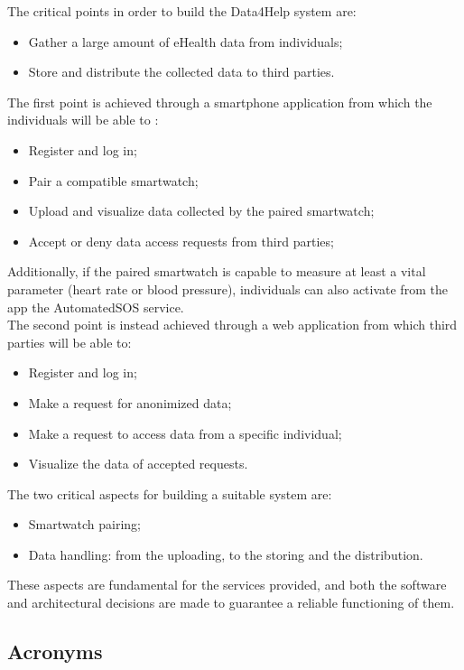 The critical points in order to build the Data4Help system are:
\begin{itemize}
\item Gather a large amount of eHealth data from individuals;
\item Store and distribute the collected data to third parties.
\end{itemize}
The first point is achieved through a smartphone application from which the individuals will be able to :
\begin{itemize}
\item Register and log in;
\item Pair a compatible smartwatch;
\item Upload and visualize data collected by the paired smartwatch;
\item Accept or deny data access requests from third parties;
\end{itemize}
Additionally, if the paired smartwatch is capable to measure at least a vital parameter (heart rate or blood pressure), individuals can also activate from the app the AutomatedSOS service.
\\
The second point is instead achieved through a web application from which third parties will be able to:
\begin{itemize}
\item Register and log in;
\item Make a request for anonimized data;
\item Make a request to access data from a specific individual;
\item Visualize the data of accepted requests.
\end{itemize}

The two critical aspects for building a suitable system are:

\begin{itemize}
\item Smartwatch pairing;
\item Data handling: from the uploading, to the storing and the distribution.
\end{itemize}

These aspects are fundamental for the services provided, and both the software and architectural decisions are made to guarantee a reliable functioning of them.





\subsection{Acronyms}

